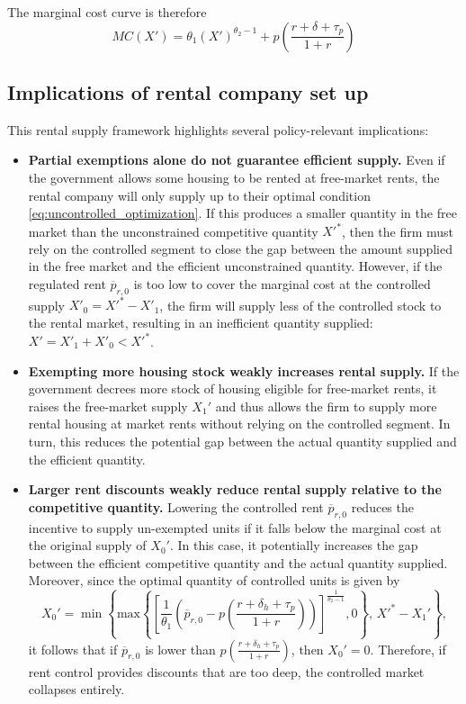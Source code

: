 \documentclass[parskip=full]{article}
\begin{document}
\noindent The marginal cost curve is therefore \[MC(X')=\theta_1(X')^{\theta_2-1}+p\left(\frac{r+\delta+\tau_p}{1+r}\right)\]

\subsection{Implications of rental company set up}

This rental supply framework highlights several policy-relevant implications:

\begin{itemize}

\item \textbf{Partial exemptions alone do not guarantee efficient supply.} 
Even if the government allows some housing to be rented at free-market rents, the rental company will only supply up to their optimal condition \eqref{eq:uncontrolled_optimization}. If this produces a smaller quantity in the free market than the unconstrained competitive quantity $X'^*$, then the firm must rely on the controlled segment to close the gap between the amount supplied in the free market and the efficient unconstrained quantity. However, if the regulated rent $\overline{p}_{r,0}$ is too low to cover the marginal cost at the controlled supply $X'_0=X'^*-X'_1$, the firm will supply less of the controlled stock to the rental market, resulting in an inefficient quantity supplied: $X'=X'_1+X'_0<X'^*$.

\item \textbf{Exempting more housing stock weakly increases rental supply.} 
If the government decrees more stock of housing eligible for free-market rents, it raises the free-market supply $X_1'$ and thus allows the firm to supply more rental housing at market rents without relying on the controlled segment. In turn, this reduces the potential gap between the actual quantity supplied and the efficient quantity.

\item \textbf{Larger rent discounts weakly reduce rental supply relative to the competitive quantity.} 
Lowering the controlled rent $\overline{p}_{r,0}$ reduces the incentive to supply un-exempted units if it falls below the marginal cost at the original supply of $X_0'$. In this case, it potentially increases the gap between the efficient competitive quantity and the actual quantity supplied. Moreover, since the optimal quantity of controlled units is given by \[X_0'=\min\left\{\text{max}\left\{\left[\frac{1}{\theta_{1}}\left(\overline{p}_{r,0}-p\left(\frac{r+\delta_{h}+\tau_{p}}{1+r}\right)\right)\right]^{\frac{1}{\theta_{2}-1}},0\right\},\, X'^*-X_1'\right\},\]
it follows that if $\overline{p}_{r,0}$ is lower than 
$p\left(\frac{r+\delta_{h}+\tau_{p}}{1+r} \right)$, then $X_0'=0$. Therefore, if rent control provides discounts that are too deep, the controlled market collapses entirely.

\end{itemize}
\end{document}
